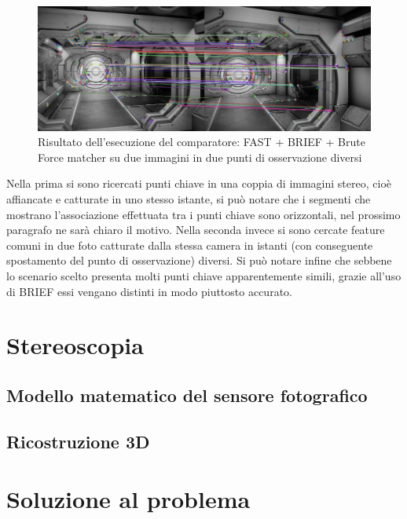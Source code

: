 \begin{figure}[h!]
	\centering
	\includegraphics[width=420pt]{imgs/TwoInstantDetection.jpg}
	\caption{Risultato dell'esecuzione del comparatore: FAST + BRIEF + Brute Force matcher su due immagini in due punti di osservazione diversi}
	\label{vis:feature:risTwo}
\end{figure} 
Nella prima si sono ricercati punti chiave in una coppia di immagini stereo, cioè affiancate e catturate in uno stesso istante, si può notare che i segmenti che mostrano l'associazione effettuata tra i punti chiave sono orizzontali, nel prossimo paragrafo ne sarà chiaro il motivo. Nella seconda invece si sono cercate feature comuni in due foto catturate dalla stessa camera in istanti (con conseguente spostamento del punto di osservazione) diversi. Si può notare infine che sebbene lo scenario scelto presenta molti punti chiave apparentemente simili, grazie all'uso di BRIEF essi vengano distinti in modo piuttosto accurato. 
\section{Stereoscopia}
\label{sec:stereo}




\subsection{Modello matematico del sensore fotografico}
\label{sec:stereo:modello}


\subsection{Ricostruzione 3D}
\label{sec:stereo:ric3d}


\section{Soluzione al problema}
\label{sec:vision:solution}


